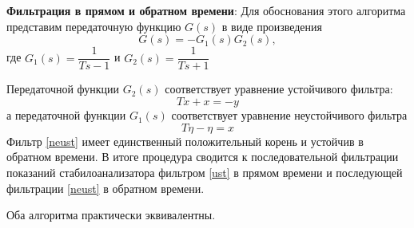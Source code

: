 \documentclass[a4paper,12pt, openany]{book}
\theoremstyle{plain} %
\theoremstyle{definition} %
\theoremstyle{remark} %
\numberwithin{equation}{chapter}
\begin{document}
{\textbf{Фильтрация в прямом и обратном времени}: Для
обоснования этого алгоритма представим передаточную функцию $G(s)$ в виде произведения
\[
    G(s) =-G_1(s)G_2(s),
\]
где $G_1(s)=\dfrac{1}{Ts-1}$ и $G_2(s)=\dfrac{1}{Ts+1}$

Передаточной функции $G_2(s)$ соответствует
уравнение устойчивого фильтра:
\begin{equation}\label{ust}
    T\dot{x}+x=-y
\end{equation}
а передаточной функции $G_1(s)$ соответствует уравнение неустойчивого фильтра
\begin{equation}\label{neust}
    T\dot{\eta}-\eta=x
\end{equation}
Фильтр \eqref{neust} имеет единственный положительный корень и устойчив в обратном времени. В
итоге процедура сводится к последовательной фильтрации показаний стабилоанализатора
фильтром \eqref{ust} в прямом времени и последующей фильтрации \eqref{neust} в обратном времени. 

Оба алгоритма практически эквивалентны.
}
\end{document}
